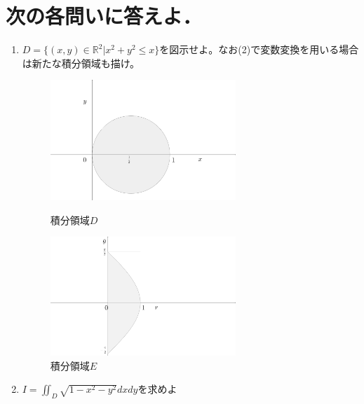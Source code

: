 \documentclass[a4paper,10pt]{jarticle}
\begin{document}
\newpage
\section{次の各問いに答えよ．}
\begin{enumerate}
\item $ D=\{(x,y) \in \mathbb{R}^2 | x^2+y^2 \leq x\}$を図示せよ。なお(2)で変数変換を用いる場合は新たな積分領域も描け。
\begin{figure}[h]\begin{minipage}{0.5\hsize}
	\begin{center}
		\includegraphics[width=70mm,bb  = 0 0 300 200]{41.png}
	\end{center}
 	\caption{積分領域$D$}
\end{minipage}
\begin{minipage}{0.5\hsize}
	\begin{center}
		\includegraphics[width=70mm,bb  = 0 0 300 200]{42.png}
	\end{center}
	\caption{積分領域$E$}
\end{minipage}
\end{figure}
\item$ I=\iint_{D} \sqrt{1-x^2-y^2}dxdy$を求めよ


\end{enumerate}
\end{document}
